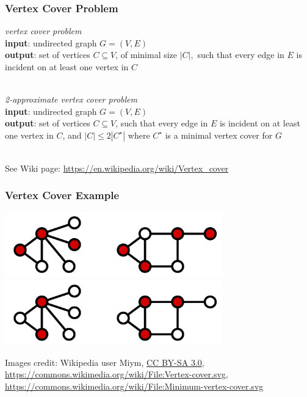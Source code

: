 \documentclass[10pt,aspectratio=169]{beamer}
\newcommand{\stanza}{ \\~\ }
\begin{document}
\begin{frame} \frametitle{Vertex Cover Problem}
\emph{vertex cover problem} \\
\textbf{input}: undirected graph $G=(V,E)$ \\
\textbf{output}: set of vertices $C \subseteq V$, of minimal size $|C|,$ such
  that every edge in $E$ is incident on at least one vertex in $C$
 \stanza

 \emph{2-approximate vertex cover problem} \\
 \textbf{input}: undirected graph $G=(V,E)$ \\
 \textbf{output}: set of vertices $C \subseteq V$, such
   that every edge in $E$ is incident on at least one vertex in $C$, and
   $|C| \leq 2 |C^\star|$ where $C^\star$ is a minimal vertex cover for $G$
  \stanza

See Wiki page: \url{https://en.wikipedia.org/wiki/Vertex_cover}
\end{frame}

\begin{frame} \frametitle{Vertex Cover Example}
  \begin{center}
    \includegraphics[height=80pt]{13-vertex-cover-1.png}
    \includegraphics[height=80pt]{13-vertex-cover-2.png}
  \end{center}

  {\tiny
  Images credit: Wikipedia user Miym,
  \href{https://creativecommons.org/licenses/by-sa/3.0)}{CC BY-SA 3.0},
  \url{https://commons.wikimedia.org/wiki/File:Vertex-cover.svg},
  \url{https://commons.wikimedia.org/wiki/File:Minimum-vertex-cover.svg}
  }
\end{frame}
\end{document}
